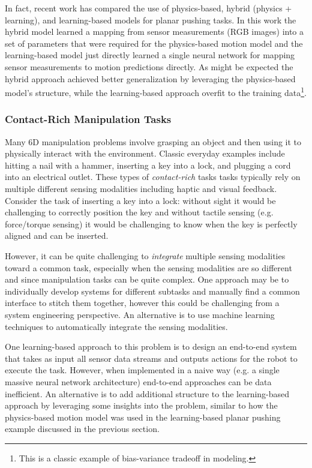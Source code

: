 In fact, recent work\cite{KlossSchaalEtAl2020} has compared the use of physics-based, hybrid (physics + learning), and learning-based models for planar pushing tasks. In this work the hybrid model learned a mapping from sensor measurements (RGB images) into a set of parameters that were required for the physics-based motion model and the learning-based model just directly learned a single neural network for mapping sensor measurements to motion predictions directly. As might be expected the hybrid approach achieved better generalization by leveraging the physics-based model's structure, while the learning-based approach overfit to the training data\footnote{This is a classic example of bias-variance tradeoff in modeling.}.


\subsubsection{Contact-Rich Manipulation Tasks}
Many 6D manipulation problems involve grasping an object and then using it to physically interact with the environment. Classic everyday examples include hitting a nail with a hammer, inserting a key into a lock, and plugging a cord into an electrical outlet. These types of \textit{contact-rich} tasks tasks typically rely on multiple different sensing modalities including haptic and visual feedback. Consider the task of inserting a key into a lock: without sight it would be challenging to correctly position the key and without tactile sensing (e.g. force/torque sensing) it would be challenging to know when the key is perfectly aligned and can be inserted.

However, it can be quite challenging to \textit{integrate} multiple sensing modalities toward a common task, especially when the sensing modalities are so different and since manipulation tasks can be quite complex. One approach may be to individually develop systems for different subtasks and manually find a common interface to stitch them together, however this could be challenging from a system engineering perspective. An alternative is to use machine learning techniques to automatically integrate the sensing modalities.

One learning-based approach to this problem is to design an end-to-end system that takes as input all sensor data streams and outputs actions for the robot to execute the task. However, when implemented in a naive way (e.g. a single massive neural network architecture) end-to-end approaches can be data inefficient. An alternative is to add additional structure to the learning-based approach by leveraging some insights into the problem, similar to how the physics-based motion model was used in the learning-based planar pushing example discussed in the previous section.

